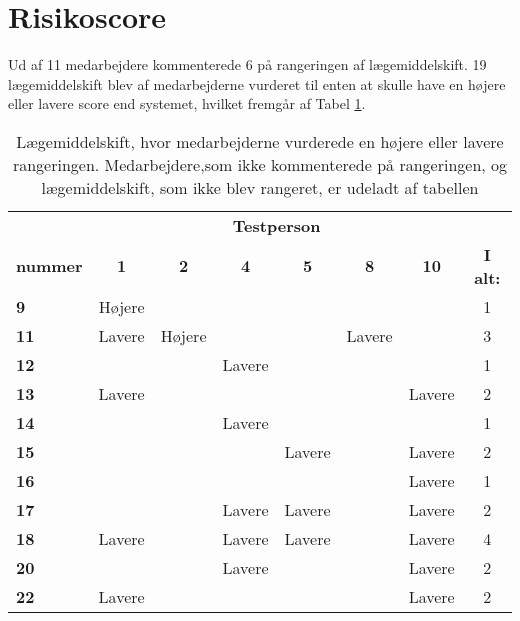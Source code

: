 \section{Risikoscore} \label{App:Rang}
Ud af 11 medarbejdere kommenterede 6 på rangeringen af lægemiddelskift. 19 lægemiddelskift blev af medarbejderne vurderet til enten at skulle have en højere eller lavere score end systemet, hvilket fremgår af Tabel \ref{table:resultat3}.


\begin{longtable}{l|c|c|c|c|c|c|c}\caption{Lægemiddelskift, hvor medarbejderne vurderede en højere eller lavere rangeringen. Medarbejdere,som ikke kommenterede på rangeringen, og lægemiddelskift, som ikke blev rangeret, er udeladt af tabellen}
\label{table:resultat3} \\
\rowcolor[HTML]{C0C0C0}{\textbf{Lægemiddel}}& \multicolumn{6}{c}{\textbf{Testperson}} &  \\
\rowcolor[HTML]{C0C0C0}\textbf{nummer}& \textbf{1} & \textbf{2} & \textbf{4} & \textbf{5} & \textbf{8} & \textbf{10}  & \textbf{I alt:}\\ \hline
\cellcolor[HTML]{C0C0C0}\textbf{9} & Højere & & & & &  & \cellcolor[HTML]{EFEFEF} 1 \\ \hline
\cellcolor[HTML]{C0C0C0}\textbf{11} & Lavere & Højere & & & Lavere &  & \cellcolor[HTML]{EFEFEF}3 \\\hline
\cellcolor[HTML]{C0C0C0}\textbf{12} & & & Lavere & & & & \cellcolor[HTML]{EFEFEF}1 \\\hline
\cellcolor[HTML]{C0C0C0}\textbf{13}& Lavere  & & & & & Lavere  & \cellcolor[HTML]{EFEFEF}2  \\ \hline
\cellcolor[HTML]{C0C0C0}\textbf{14} &  & & Lavere  & & &  & \cellcolor[HTML]{EFEFEF}1 \\ \hline
\cellcolor[HTML]{C0C0C0}\textbf{15} & & & & Lavere & & Lavere  & \cellcolor[HTML]{EFEFEF}2 \\\hline
\cellcolor[HTML]{C0C0C0}\textbf{16} & & & &  & & Lavere & \cellcolor[HTML]{EFEFEF}1 \\\hline
\cellcolor[HTML]{C0C0C0}\textbf{17}& & & Lavere & Lavere & & Lavere & \cellcolor[HTML]{EFEFEF}2 \\\hline
\cellcolor[HTML]{C0C0C0}\textbf{18} & Lavere & & Lavere & Lavere & & Lavere & \cellcolor[HTML]{EFEFEF}4 \\\hline
\cellcolor[HTML]{C0C0C0}\textbf{20} & & & Lavere &  & & Lavere & \cellcolor[HTML]{EFEFEF}2 \\\hline
\cellcolor[HTML]{C0C0C0}\textbf{22} & Lavere & &  &  & & Lavere & \cellcolor[HTML]{EFEFEF} 2\\\hline

\end{longtable}
